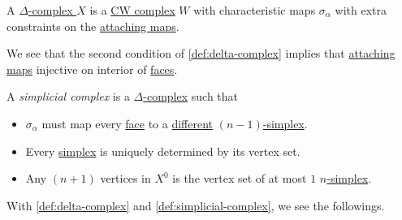 \begin{exercise}
	A \hyperref[def:delta-complex]{\(\Delta\)-complex } \(X\) is a \hyperref[def:CW-Complex]{CW complex} \(W\) with characteristic maps \(\sigma _\alpha \)
	with extra constraints on the \hyperref[def:attaching-map]{attaching maps}.
\end{exercise}
\begin{note}
	We see that the second condition of \autoref{def:delta-complex} implies that \hyperref[def:attaching-map]{attaching maps} injective on interior of \hyperref[def:face]{faces}.
\end{note}

\begin{definition}\label{def:simplicial-complex}
	A \emph{simplicial complex} is a \hyperref[def:delta-complex]{\(\Delta \)-complex} such that
	\begin{itemize}
		\item \(\sigma _\alpha \) must map every \hyperref[def:face]{face} to a \underline{different} \hyperref[def:standard-simplex]{\((n-1)\)-simplex}.
		\item Every \hyperref[def:standard-simplex]{simplex} is uniquely determined by its vertex set.
		\item Any \((n+1)\) vertices in \(X^0\) is the vertex set of at most \(1\) \hyperref[def:standard-simplex]{\(n\)-simplex}.
	\end{itemize}
\end{definition}
\begin{eg}
	With \autoref{def:delta-complex} and \autoref{def:simplicial-complex}, we see the followings.
	\begin{figure}[H]
		\centering
		\label{fig:rmk:simplicial-complex}
	\end{figure}
\end{eg}

